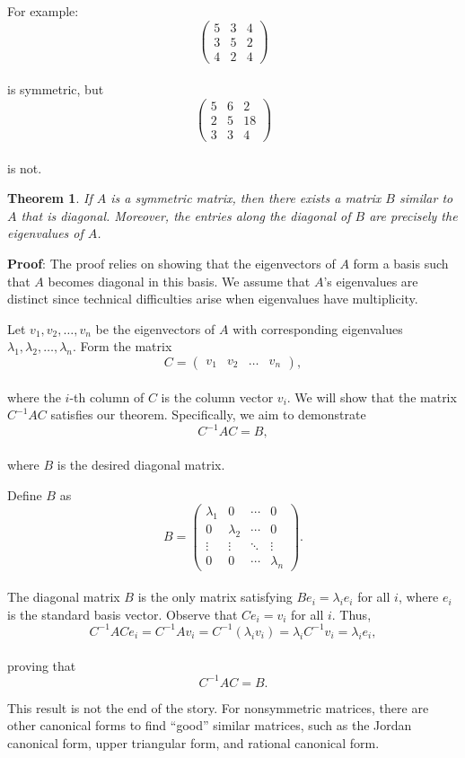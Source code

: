 \documentclass[
]{book}
\newtheorem{theorem}{Theorem}[chapter]
\theoremstyle{definition}
\theoremstyle{definition}
\theoremstyle{definition}
\theoremstyle{definition}
\theoremstyle{remark}
\begin{document}
For example:\\
\[
\begin{pmatrix}
5 & 3 & 4 \\
3 & 5 & 2 \\
4 & 2 & 4
\end{pmatrix}
\]\\
is symmetric, but\\
\[
\begin{pmatrix}
5 & 6 & 2 \\
2 & 5 & 18 \\
3 & 3 & 4
\end{pmatrix}
\]\\
is not.

\begin{theorem}
If \(A\) is a symmetric matrix, then there exists a matrix \(B\) similar to \(A\) that is diagonal. Moreover, the entries along the diagonal of \(B\) are precisely the eigenvalues of \(A\).
\end{theorem}

\textbf{Proof}: The proof relies on showing that the eigenvectors of \(A\) form a basis such that \(A\) becomes diagonal in this basis. We assume that \(A\)'s eigenvalues are distinct since technical difficulties arise when eigenvalues have multiplicity.

Let \(v_1, v_2, \dots, v_n\) be the eigenvectors of \(A\) with corresponding eigenvalues \(\lambda_1, \lambda_2, \dots, \lambda_n\). Form the matrix\\
\[
C = 
\begin{pmatrix}
v_1 & v_2 & \dots & v_n
\end{pmatrix},
\]\\
where the \(i\)-th column of \(C\) is the column vector \(v_i\). We will show that the matrix \(C^{-1}AC\) satisfies our theorem. Specifically, we aim to demonstrate\\
\[
C^{-1}AC = B,
\]\\
where \(B\) is the desired diagonal matrix.

Define \(B\) as\\
\[
B = 
\begin{pmatrix}
\lambda_1 & 0 & \cdots & 0 \\
0 & \lambda_2 & \cdots & 0 \\
\vdots & \vdots & \ddots & \vdots \\
0 & 0 & \cdots & \lambda_n
\end{pmatrix}.
\]\\
The diagonal matrix \(B\) is the only matrix satisfying \(Be_i = \lambda_i e_i\) for all \(i\), where \(e_i\) is the standard basis vector. Observe that \(Ce_i = v_i\) for all \(i\). Thus,\\
\[
C^{-1}ACe_i = C^{-1}Av_i = C^{-1}(\lambda_i v_i) = \lambda_i C^{-1}v_i = \lambda_i e_i,
\]\\
proving that\\
\[
C^{-1}AC = B.
\]

This result is not the end of the story. For nonsymmetric matrices, there are other canonical forms to find ``good'' similar matrices, such as the Jordan canonical form, upper triangular form, and rational canonical form.

  
\end{document}
